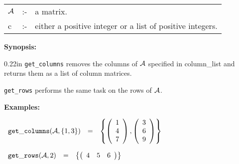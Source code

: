 \hspace*{0.1in} 
\begin{tabular}{l l l}
${\cal A}$ &:-& a matrix. \\
c          &:-& either a positive integer or a list of positive 
                integers.
\end{tabular}

{\bf Synopsis:} %

\begin{addtolength}{\leftskip}{0.22in}
{\tt get\_columns} removes the columns of ${\cal A}$ specified in 
                column\_list and returns them as a list of column 
                matrices. 

\end{addtolength}
\hspace*{0.175in} {\tt get\_rows} performs the same task on the rows of 
                ${\cal A}$. 

{\bf Examples:}

\begin{flushleft}  
\hspace*{0.1in}
\begin{math}  
\begin{array}{ccc}
{\tt get\_columns}({\cal A},\{1,3\}) & = & 
\left\{ 
        \left( \begin{array}{c} 1 \\ 4 \\ 7 \end{array} \right),
        \left( \begin{array}{c} 3 \\ 6 \\ 9 \end{array} \right) 
\right\} 
\end{array}
\end{math}  
\end{flushleft}

\vspace*{0.1in}

\begin{flushleft}  
\hspace*{0.1in}
\begin{math}  
\begin{array}{ccc}
{\tt get\_rows}({\cal A},2) & = & 
\left\{ 
        \left( \begin{array}{ccc} 4 & 5 & 6 \end{array} \right)
\right\} 
\end{array}
\end{math}  
\end{flushleft}

